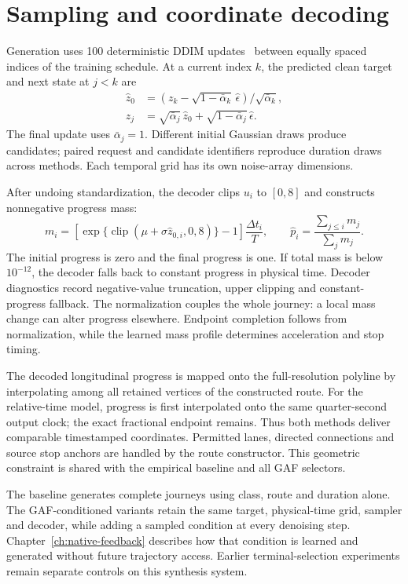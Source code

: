 \section{Sampling and coordinate decoding}
Generation uses 100 deterministic DDIM updates~\cite{ddim} between equally spaced indices of the training schedule. At a current index $k$, the predicted clean target and next state at $j<k$ are
\begin{align}
 \hat z_0&=(z_k-\sqrt{1-\bar\alpha_k}\,\hat\epsilon)/\sqrt{\bar\alpha_k},\\
 z_j&=\sqrt{\bar\alpha_j}\,\hat z_0+\sqrt{1-\bar\alpha_j}\,\hat\epsilon.
 \label{eq:native-ddim}
\end{align}
The final update uses $\bar\alpha_j=1$. Different initial Gaussian draws produce candidates; paired request and candidate identifiers reproduce duration draws across methods. Each temporal grid has its own noise-array dimensions.

After undoing standardization, the decoder clips $u_i$ to $[0,8]$ and constructs nonnegative progress mass:
\begin{equation}
 m_i=\left[\exp\{\operatorname{clip}(\mu+\sigma\hat z_{0,i},0,8)\}-1\right]
       \frac{\Delta t_i}{T},\qquad
 \hat p_i=\frac{\sum_{j\leq i}m_j}{\sum_jm_j}.
 \label{eq:native-decoder}
\end{equation}
The initial progress is zero and the final progress is one. If total mass is below $10^{-12}$, the decoder falls back to constant progress in physical time. Decoder diagnostics record negative-value truncation, upper clipping and constant-progress fallback. The normalization couples the whole journey: a local mass change can alter progress elsewhere. Endpoint completion follows from normalization, while the learned mass profile determines acceleration and stop timing.

The decoded longitudinal progress is mapped onto the full-resolution polyline by interpolating among all retained vertices of the constructed route. For the relative-time model, progress is first interpolated onto the same quarter-second output clock; the exact fractional endpoint remains. Thus both methods deliver comparable timestamped coordinates. Permitted lanes, directed connections and source stop anchors are handled by the route constructor. This geometric constraint is shared with the empirical baseline and all GAF selectors.

The baseline generates complete journeys using class, route and duration alone. The GAF-conditioned variants retain the same target, physical-time grid, sampler and decoder, while adding a sampled condition at every denoising step. Chapter~\ref{ch:native-feedback} describes how that condition is learned and generated without future trajectory access. Earlier terminal-selection experiments remain separate controls on this synthesis system.
